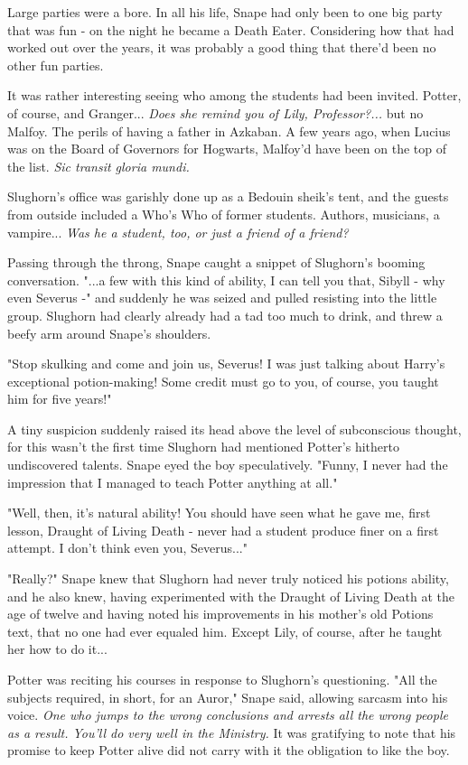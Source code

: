 \documentclass[a4paper,11pt]{article}
\begin{document}
Large parties were a bore. In all his life, Snape had only been to one big party that was fun - on the night he became a Death Eater. Considering how that had worked out over the years, it was probably a good thing that there'd been no other fun parties.

It was rather interesting seeing who among the students had been invited. Potter, of course, and Granger... \emph{Does she remind you of Lily, Professor?...} but no Malfoy. The perils of having a father in Azkaban. A few years ago, when Lucius was on the Board of Governors for Hogwarts, Malfoy'd have been on the top of the list. \emph{Sic transit gloria mundi.}

Slughorn's office was garishly done up as a Bedouin sheik's tent, and the guests from outside included a Who's Who of former students. Authors, musicians, a vampire... \emph{Was he a student, too, or just a friend of a friend?}

Passing through the throng, Snape caught a snippet of Slughorn's booming conversation. "...a few with this kind of ability, I can tell you that, Sibyll - why even Severus -" and suddenly he was seized and pulled resisting into the little group. Slughorn had clearly already had a tad too much to drink, and threw a beefy arm around Snape's shoulders.

"Stop skulking and come and join us, Severus! I was just talking about Harry's exceptional potion-making! Some credit must go to you, of course, you taught him for five years!"

A tiny suspicion suddenly raised its head above the level of subconscious thought, for this wasn't the first time Slughorn had mentioned Potter's hitherto undiscovered talents. Snape eyed the boy speculatively. "Funny, I never had the impression that I managed to teach Potter anything at all."

"Well, then, it's natural ability! You should have seen what he gave me, first lesson, Draught of Living Death - never had a student produce finer on a first attempt. I don't think even you, Severus..."

"Really?" Snape knew that Slughorn had never truly noticed his potions ability, and he also knew, having experimented with the Draught of Living Death at the age of twelve and having noted his improvements in his mother's old Potions text, that no one had ever equaled him. Except Lily, of course, after he taught her how to do it...

Potter was reciting his courses in response to Slughorn's questioning. "All the subjects required, in short, for an Auror," Snape said, allowing sarcasm into his voice. \emph{One who jumps to the wrong conclusions and arrests all the wrong people as a result. You'll do very well in the Ministry.} It was gratifying to note that his promise to keep Potter alive did not carry with it the obligation to like the boy.
\end{document}
